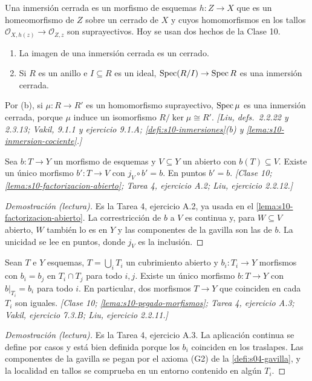 \begin{defi}
\label{defi:s11-inmersion-cerrada}
Una inmersión cerrada es un morfismo de esquemas \(h\colon Z\to X\) que es un homeomorfismo de \(Z\) sobre un cerrado de \(X\) y cuyos homomorfismos en los tallos \(\mathcal O_{X,h(z)}\to\mathcal O_{Z,z}\) son suprayectivos. Hoy se usan dos hechos de la Clase 10.
\begin{enumerate}[label=(\alph*)]
\item La imagen de una inmersión cerrada es un cerrado.
\item Si \(R\) es un anillo e \(I\subseteq R\) es un ideal, \(\operatorname{Spec}(R/I)\to\operatorname{Spec} R\) es una inmersión cerrada.
\end{enumerate}
Por (b), si \(\mu\colon R\to R'\) es un homomorfismo suprayectivo, \(\operatorname{Spec}\mu\) es una inmersión cerrada, porque \(\mu\) induce un isomorfismo \(R/\ker\mu\cong R'\). \emph{[Liu, defs.~2.2.22 y 2.3.13; Vakil, 9.1.1 y ejercicio 9.1.A; \cref{defi:s10-inmersiones}(b) y \cref{lema:s10-inmersion-cociente}.]}
\end{defi}

\begin{lema}
\label{lema:s11-imagen-abierto}
Sea \(b\colon T\to Y\) un morfismo de esquemas y \(V\subseteq Y\) un abierto con \(b(T)\subseteq V\). Existe un único morfismo \(b'\colon T\to V\) con \(j_V\circ b'=b\). En puntos \(b'=b\). \emph{[Clase 10; \cref{lema:s10-factorizacion-abierto}; Tarea 4, ejercicio A.2; Liu, ejercicio 2.2.12.]}
\end{lema}
\begin{proof}[Demostración (lectura)]
Es la Tarea 4, ejercicio A.2, ya usada en el \cref{lema:s10-factorizacion-abierto}. La correstricción de \(b\) a \(V\) es continua y, para \(W\subseteq V\) abierto, \(W\) también lo es en \(Y\) y las componentes de la gavilla son las de \(b\). La unicidad se lee en puntos, donde \(j_V\) es la inclusión.
\end{proof}

\begin{lema}
\label{lema:s11-morfismos-pegan}
Sean \(T\) e \(Y\) esquemas, \(T=\bigcup_i T_i\) un cubrimiento abierto y \(b_i\colon T_i\to Y\) morfismos con \(b_i=b_j\) en \(T_i\cap T_j\) para todo \(i,j\). Existe un único morfismo \(b\colon T\to Y\) con \(b|_{T_i}=b_i\) para todo \(i\). En particular, dos morfismos \(T\to Y\) que coinciden en cada \(T_i\) son iguales. \emph{[Clase 10; \cref{lema:s10-pegado-morfismos}; Tarea 4, ejercicio A.3; Vakil, ejercicio 7.3.B; Liu, ejercicio 2.2.11.]}
\end{lema}
\begin{proof}[Demostración (lectura)]
Es la Tarea 4, ejercicio A.3. La aplicación continua se define por casos y está bien definida porque los \(b_i\) coinciden en los traslapes. Las componentes de la gavilla se pegan por el axioma (G2) de la \cref{defi:s04-gavilla}, y la localidad en tallos se comprueba en un entorno contenido en algún \(T_i\).
\end{proof}

